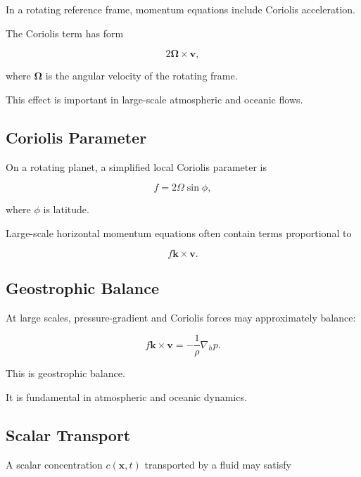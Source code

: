 In a rotating reference frame, momentum equations include Coriolis
acceleration.

The Coriolis term has form

\[
\boxed{
2\boldsymbol{\Omega}\times\mathbf{v},
}
\]

where \(\boldsymbol{\Omega}\) is the angular velocity of the rotating frame.

This effect is important in large-scale atmospheric and oceanic flows.

\subsection{Coriolis Parameter}
\label{subsec:coriolis-parameter}

On a rotating planet, a simplified local Coriolis parameter is

\[
\boxed{
f
=
2\Omega\sin\phi,
}
\]

where \(\phi\) is latitude.

Large-scale horizontal momentum equations often contain terms proportional to

\[
\boxed{
f\mathbf{k}\times\mathbf{v}.
}
\]

\subsection{Geostrophic Balance}
\label{subsec:geostrophic-balance}

At large scales, pressure-gradient and Coriolis forces may approximately
balance:

\[
\boxed{
f\mathbf{k}\times\mathbf{v}
=
-\frac{1}{\rho}\nabla_h p.
}
\]

This is geostrophic balance.

It is fundamental in atmospheric and oceanic dynamics.

\subsection{Scalar Transport}
\label{subsec:fluid-scalar-transport}

A scalar concentration \(c(\mathbf{x},t)\) transported by a fluid may satisfy

